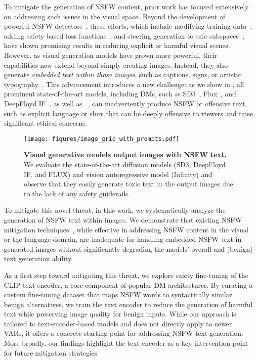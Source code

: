 To mitigate the generation of NSFW content, prior work has focused extensively on addressing such issues in the visual space.
Beyond the development of powerful NSFW detectors~\citep{nsfwdetector,nudenet}, these efforts, which include modifying training data~\citep{zong2024safety}, adding safety-based loss functions~\citep{poppi2025safe,gandikota2023erasing}, and steering generation to safe subspaces~\citep{schramowski2023safe}, have shown promising results in reducing explicit or harmful visual scenes. 
However, as visual generation models have grown more powerful, their capabilities now extend beyond simply creating images. 
Instead, they also generate \textit{embedded text within those images}, such as captions, signs, or artistic typography~\citep{esser2024scalingSD3,textdiffuser,DeepFloydIF,flux}. This advancement introduces a new challenge: as we show in , 
all prominent state-of-the-art models, including DMs, such as SD3~\citep{esser2024scalingSD3}, Flux~\citep{flux}, and DeepFloyd IF~\citep{DeepFloydIF}, as well as \VARs~\citep{han2024infinity}, can inadvertently produce NSFW or offensive text, such as explicit language or slurs that can be deeply offensive to viewers and raise significant ethical concerns.
\begin{wrapfigure}{r}{0.4\textwidth}
    \centering
    \texttt{[image: figures/image\_grid\_with\_prompts.pdf]}
    \caption{\textbf{Visual generative models output images with NSFW text.} We evaluate the state-of-the-art diffusion models (SD3, DeepFloyd IF, and FLUX) and vision autoregressive model (Infinity)
    and observe that they easily generate toxic text in the output images due to the lack of any safety guiderails.
    }
    \label{fig:toxic_overview}
\end{wrapfigure}
To mitigate this novel threat, in this work, we systematically analyze the generation of NSFW text within images. We demonstrate that existing NSFW
mitigation techniques~\citep{gandikota2023erasing,poppi2025safe,suau2024whispering}, while effective in addressing NSFW content in the visual or the language domain, are inadequate for handling embedded NSFW text in generated images without significantly degrading the models' overall and (benign) text generation ability. 

As a first step toward mitigating this threat, we explore safety fine-tuning of the CLIP text encoder, a core component of popular DM architectures. By curating a custom fine-tuning dataset that maps NSFW words to syntactically similar benign alternatives, we train the text encoder to reduce the generation of harmful text while preserving image quality for benign inputs.
While our approach is tailored to text-encoder-based models and does not directly apply to newer VARs, it offers a concrete starting point for addressing NSFW text generation. More broadly, our findings highlight the text encoder as a key intervention point for future mitigation strategies.

